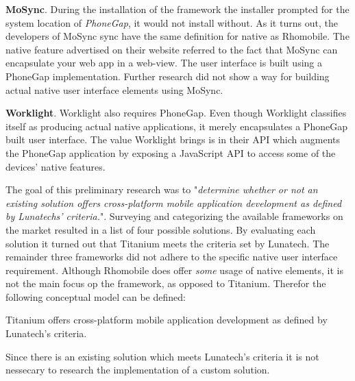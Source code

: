 {\bf MoSync}. During the installation of the framework the installer prompted for the system location of \emph{PhoneGap}, it would not install without. As it turns out, the developers of MoSync sync have the same definition for native as Rhomobile. The native feature advertised on their website referred to the fact that MoSync can encapsulate your web app in a web-view. The user interface is built using a PhoneGap implementation. Further research did not show a way for building actual native user interface elements using MoSync.

{\bf Worklight}. Worklight also requires PhoneGap. Even though Worklight classifies itself as producing actual native applications, it merely encapsulates a PhoneGap built user interface. The value Worklight brings is in their API which augments the PhoneGap application by exposing a JavaScript API to access some of the devices' native features.

The goal of this preliminary research was to "\emph{determine whether or not an existing solution offers cross-platform mobile application development as defined by Lunatechs' criteria.}".  Surveying and categorizing the available frameworks on the market resulted in a list of four possible solutions. By evaluating each solution it turned out that Titanium meets the criteria set by Lunatech. The remainder three frameworks did not adhere to the specific native user interface requirement. Although Rhomobile does offer \emph{some} usage of native elements, it is not the main focus op the framework, as opposed to Titanium. Therefor the following conceptual model can be defined:
\begin{shadequote}
Titanium offers cross-platform mobile application development as defined by Lunatech's criteria.%
\end{shadequote}

Since there is an existing solution which meets Lunatech's criteria it is not nessecary to research the implementation of a custom solution.%
